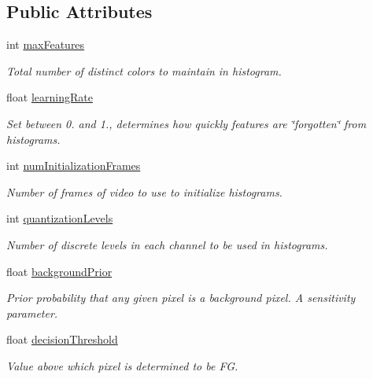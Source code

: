 \subsection*{Public Attributes}
\begin{DoxyCompactItemize}
\item 
int \hyperlink{classcv_1_1gpu_1_1GMG__GPU_aef13a3000e96aea8f8599e933e0b0492}{max\-Features}
\begin{DoxyCompactList}\small\item\em Total number of distinct colors to maintain in histogram. \end{DoxyCompactList}\item 
float \hyperlink{classcv_1_1gpu_1_1GMG__GPU_a05dad91a91ad2a893a79f0b95920e24c}{learning\-Rate}
\begin{DoxyCompactList}\small\item\em Set between 0. and 1., determines how quickly features are \char`\"{}forgotten\char`\"{} from histograms. \end{DoxyCompactList}\item 
int \hyperlink{classcv_1_1gpu_1_1GMG__GPU_ab4796b2f60da0a859dd242ec5681ea43}{num\-Initialization\-Frames}
\begin{DoxyCompactList}\small\item\em Number of frames of video to use to initialize histograms. \end{DoxyCompactList}\item 
int \hyperlink{classcv_1_1gpu_1_1GMG__GPU_a562b4ad84c3c15f6c952e26304a854f1}{quantization\-Levels}
\begin{DoxyCompactList}\small\item\em Number of discrete levels in each channel to be used in histograms. \end{DoxyCompactList}\item 
float \hyperlink{classcv_1_1gpu_1_1GMG__GPU_a6377c73b49c025ba5ff12cbe6cf9f96d}{background\-Prior}
\begin{DoxyCompactList}\small\item\em Prior probability that any given pixel is a background pixel. A sensitivity parameter. \end{DoxyCompactList}\item 
float \hyperlink{classcv_1_1gpu_1_1GMG__GPU_a5ce273fb8c841b45377fa0111f71c8cc}{decision\-Threshold}
\begin{DoxyCompactList}\small\item\em Value above which pixel is determined to be F\-G. \end{DoxyCompactList}\item 

\end{DoxyCompactItemize}
